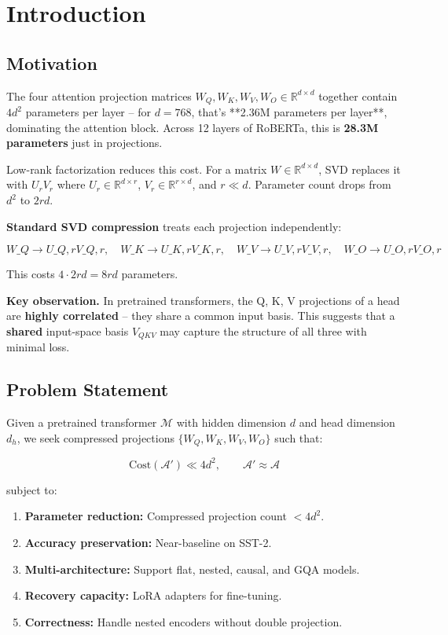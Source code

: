 \section{Introduction}

\subsection{Motivation}

The four attention projection matrices $W_Q, W_K, W_V, W_O \in \mathbb{R}^{d \times d}$ 
together contain $4 d^2$ parameters per layer -- for $d = 768$, that's **2.36M 
parameters per layer**, dominating the attention block. Across 12 layers of 
RoBERTa, this is \textbf{28.3M parameters} just in projections.

Low-rank factorization reduces this cost. For a matrix $W \in \mathbb{R}^{d \times d}$, 
SVD replaces it with $U_r V_r$ where $U_r \in \mathbb{R}^{d \times r}$, 
$V_r \in \mathbb{R}^{r \times d}$, and $r \ll d$. Parameter count drops from 
$d^2$ to $2 r d$.

\textbf{Standard SVD compression} treats each projection independently:

\[
W\_Q \to U\_{Q,r} V\_{Q,r}, \quad W\_K \to U\_{K,r} V\_{K,r}, \quad W\_V \to U\_{V,r} V\_{V,r}, \quad W\_O \to U\_{O,r} V\_{O,r}
\]

This costs $4 \cdot 2 r d = 8 r d$ parameters.

\textbf{Key observation.} In pretrained transformers, the Q, K, V projections of a 
head are \textbf{highly correlated} -- they share a common input basis. This suggests 
that a \textbf{shared} input-space basis $V_{QKV}$ may capture the structure of all 
three with minimal loss.

\subsection{Problem Statement}

Given a pretrained transformer $\mathcal{M}$ with hidden dimension $d$ and 
head dimension $d_h$, we seek compressed projections 
$\{W_Q, W_K, W_V, W_O\}$ such that:

\[
\text{Cost}(\mathcal{A}') \ll 4 d^2, \qquad
\mathcal{A}' \approx \mathcal{A}
\]

subject to:

\begin{enumerate}
\item \textbf{Parameter reduction:} Compressed projection count $< 4 d^2$.
\item \textbf{Accuracy preservation:} Near-baseline on SST-2.
\item \textbf{Multi-architecture:} Support flat, nested, causal, and GQA models.
\item \textbf{Recovery capacity:} LoRA adapters for fine-tuning.
\item \textbf{Correctness:} Handle nested encoders without double projection.

\end{enumerate}
